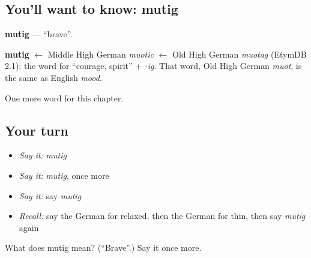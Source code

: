 \subsection*{You'll want to know: mutig}
\textbf{mutig} — \textquotedblleft{}brave\textquotedblright{}.

\begin{cousinweb}
\textbf{mutig} $\leftarrow$ Middle High German \emph{muotic} $\leftarrow$ Old High German \emph{muotag} (EtymDB 2.1): the word for \textquotedblleft{}courage, spirit\textquotedblright{} + \emph{-ig}. That word, Old High German \emph{muot}, is the same as English \emph{mood}.
\end{cousinweb}

\begin{grammarlens}[title={What you've built}]
One more word for this chapter.
\end{grammarlens}

\subsection*{Your turn}
\begin{itemize}
\raggedright
  \item \emph{Say it:} \emph{mutig}
  \item \emph{Say it:} \emph{mutig}, once more
  \item \emph{Say it:} say \emph{mutig}
  \item \emph{Recall:} say the German for relaxed, then the German for thin, then say \emph{mutig} again
\end{itemize}

\begin{tcolorbox}[breakable,colback=teal!4,colframe=teal!35!black,title={Before you move on}]
What does mutig mean? (\textquotedblleft{}Brave\textquotedblright{}.) Say it once more.
\end{tcolorbox}
